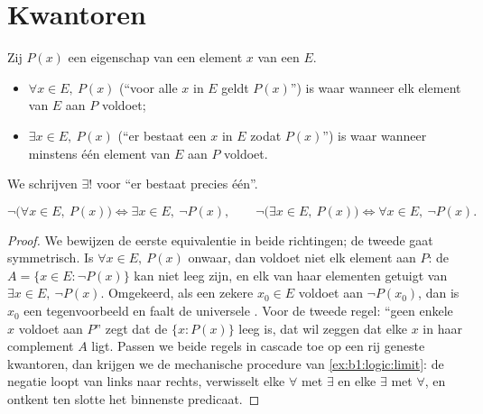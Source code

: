 \section{Kwantoren}

\begin{definition}[Kwantoren]\label{def:b1:logic:quantifiers}
Zij $P(x)$ een eigenschap van een element $x$ van een  $E$.
\begin{itemize}
  \item $\forall x \in E,\ P(x)$ (``voor alle $x$ in $E$ geldt $P(x)$'')
        is waar wanneer elk element van $E$ aan $P$ voldoet;
  \item $\exists x \in E,\ P(x)$ (``er bestaat een $x$ in $E$ zodat
        $P(x)$'') is waar wanneer minstens één element van $E$ aan $P$
        voldoet.
\end{itemize}
We schrijven $\exists!$ voor ``er bestaat precies één''.
\end{definition}

\begin{proposition}\label{prop:b1:logic:negquant}
\[
\lnot\bigl(\forall x \in E,\ P(x)\bigr) \iff
\exists x \in E,\ \lnot P(x),
\qquad
\lnot\bigl(\exists x \in E,\ P(x)\bigr) \iff
\forall x \in E,\ \lnot P(x).
\]
\end{proposition}

\begin{proof}
We bewijzen de eerste equivalentie in beide richtingen; de tweede gaat
symmetrisch. Is $\forall x \in E,\ P(x)$ onwaar, dan voldoet niet elk
element aan $P$: de  $A = \{x \in E : \lnot P(x)\}$ kan niet
leeg zijn, en elk van haar elementen getuigt van $\exists x \in E,\
\lnot P(x)$. Omgekeerd, als een zekere $x_0 \in E$ voldoet aan $\lnot
P(x_0)$, dan is $x_0$ een tegenvoorbeeld en faalt de universele
. Voor de tweede regel: ``geen enkele $x$ voldoet aan $P$''
zegt dat de \omterm{def:b1:logic:sets}{verzameling} $\{x : P(x)\}$ leeg is, dat wil zeggen dat elke
$x$ in haar complement $A$ ligt. Passen we beide regels in cascade toe
op een rij geneste kwantoren, dan krijgen we de mechanische procedure
van \cref{ex:b1:logic:limit}: de negatie loopt van links naar rechts,
verwisselt elke $\forall$ met $\exists$ en elke $\exists$ met $\forall$,
en ontkent ten slotte het binnenste predicaat.
\end{proof}

